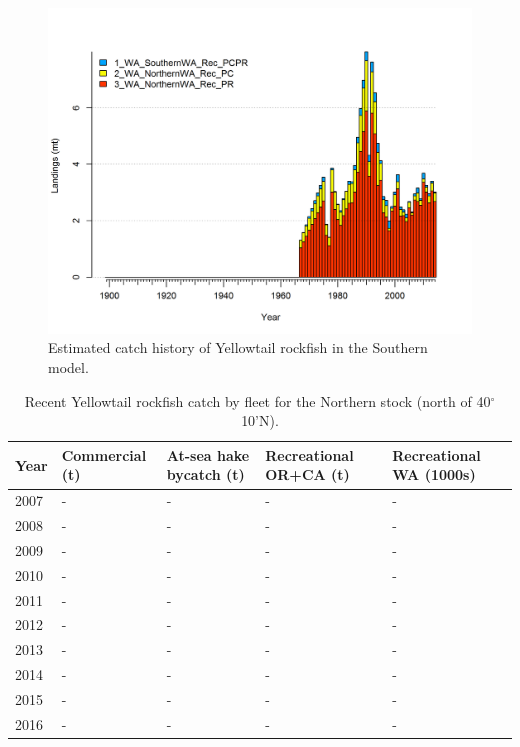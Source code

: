 \documentclass[12pt,]{article}
\begin{document}
\begin{figure}[htbp]
\centering
\includegraphics{r4ss/plots_mod2/catch2 landings stacked.png}
\caption{Estimated catch history of Yellowtail rockfish in the Southern
model. \label{fig:r4ss_catch_S}}
\end{figure}

\begin{table}[ht]
\centering
\caption{Recent Yellowtail rockfish catch by 
                                             fleet for the Northern stock 
                                             (north of 40$^\circ$ 10'N).} 
\label{tab:Exec_catch_N}
\begin{tabular}{l>{\centering}p{1.0in}>{\centering}p{1.0in}>{\centering}p{1.0in}>{\centering}p{1.0in}}
  \hline
Year & Commercial (t) & At-sea hake bycatch (t) & Recreational OR+CA (t) & Recreational WA (1000s) \\ 
  \hline
2007 & - & - & - & - \\ 
  2008 & - & - & - & - \\ 
  2009 & - & - & - & - \\ 
  2010 & - & - & - & - \\ 
  2011 & - & - & - & - \\ 
  2012 & - & - & - & - \\ 
  2013 & - & - & - & - \\ 
  2014 & - & - & - & - \\ 
  2015 & - & - & - & - \\ 
  2016 & - & - & - & - \\ 
   \hline
\end{tabular}
\end{table}
\end{document}
